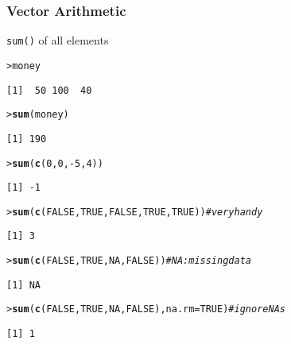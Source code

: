\documentclass[13pt,aspectratio=169]{beamer}\usepackage[]{graphicx}\usepackage[]{color}
\makeatletter
\newcommand{\hlnum}[1]{\textcolor[rgb]{0.686,0.059,0.569}{#1}}%
\newcommand{\hlcom}[1]{\textcolor[rgb]{0.678,0.584,0.686}{\textit{#1}}}%
\newcommand{\hlopt}[1]{\textcolor[rgb]{0,0,0}{#1}}%
\newcommand{\hlstd}[1]{\textcolor[rgb]{0.345,0.345,0.345}{#1}}%
\newcommand{\hlkwc}[1]{\textcolor[rgb]{0.333,0.667,0.333}{#1}}%
\newcommand{\hlkwd}[1]{\textcolor[rgb]{0.737,0.353,0.396}{\textbf{#1}}}%
\newenvironment{kframe}{%
 \def\at@end@of@kframe{}%
 \ifinner\ifhmode%
  \def\at@end@of@kframe{\end{minipage}}%
  \begin{minipage}{\columnwidth}%
 \fi\fi%
 \def\FrameCommand##1{\hskip\@totalleftmargin \hskip-\fboxsep
 \colorbox{shadecolor}{##1}\hskip-\fboxsep
     \hskip-\linewidth \hskip-\@totalleftmargin \hskip\columnwidth}%
 \MakeFramed {\advance\hsize-\width
   \@totalleftmargin\z@ \linewidth\hsize
   \@setminipage}}%
 {\par\unskip\endMakeFramed%
 \at@end@of@kframe}
\newenvironment{knitrout}{}{} %
\renewcommand{\tt}[1]{\texttt{#1}}
\renewenvironment{knitrout}{\setlength{\topsep}{0mm}}{}
\makeatother
\begin{document}
\begin{frame}[fragile]
    \frametitle{Vector Arithmetic}
\vskip10pt
\tt{sum()} of all elements
\vskip10pt
\begin{knitrout}\small
{}\color{fgcolor}\begin{kframe}
\begin{alltt}
\hlstd{> }\hlstd{money}
\end{alltt}
\begin{verbatim}
[1]  50 100  40
\end{verbatim}
\begin{alltt}
\hlstd{> }\hlkwd{sum}\hlstd{(money)}
\end{alltt}
\begin{verbatim}
[1] 190
\end{verbatim}
\begin{alltt}
\hlstd{> }\hlkwd{sum}\hlstd{(}\hlkwd{c}\hlstd{(}\hlnum{0}\hlstd{,} \hlnum{0}\hlstd{,} \hlopt{-}\hlnum{5}\hlstd{,} \hlnum{4}\hlstd{))}
\end{alltt}
\begin{verbatim}
[1] -1
\end{verbatim}
\begin{alltt}
\hlstd{> }\hlkwd{sum}\hlstd{(}\hlkwd{c}\hlstd{(}\hlnum{FALSE}\hlstd{,} \hlnum{TRUE}\hlstd{,} \hlnum{FALSE}\hlstd{,} \hlnum{TRUE}\hlstd{,} \hlnum{TRUE}\hlstd{))} \hlcom{# very handy}
\end{alltt}
\begin{verbatim}
[1] 3
\end{verbatim}
\begin{alltt}
\hlstd{> }\hlkwd{sum}\hlstd{(}\hlkwd{c}\hlstd{(}\hlnum{FALSE}\hlstd{,} \hlnum{TRUE}\hlstd{,} \hlnum{NA}\hlstd{,} \hlnum{FALSE}\hlstd{))} \hlcom{# NA: missing data}
\end{alltt}
\begin{verbatim}
[1] NA
\end{verbatim}
\begin{alltt}
\hlstd{> }\hlkwd{sum}\hlstd{(}\hlkwd{c}\hlstd{(}\hlnum{FALSE}\hlstd{,} \hlnum{TRUE}\hlstd{,} \hlnum{NA}\hlstd{,} \hlnum{FALSE}\hlstd{),} \hlkwc{na.rm} \hlstd{=} \hlnum{TRUE}\hlstd{)} \hlcom{# ignore NAs}
\end{alltt}
\begin{verbatim}
[1] 1
\end{verbatim}
\end{kframe}
\end{knitrout}
\end{frame}
\end{document}
